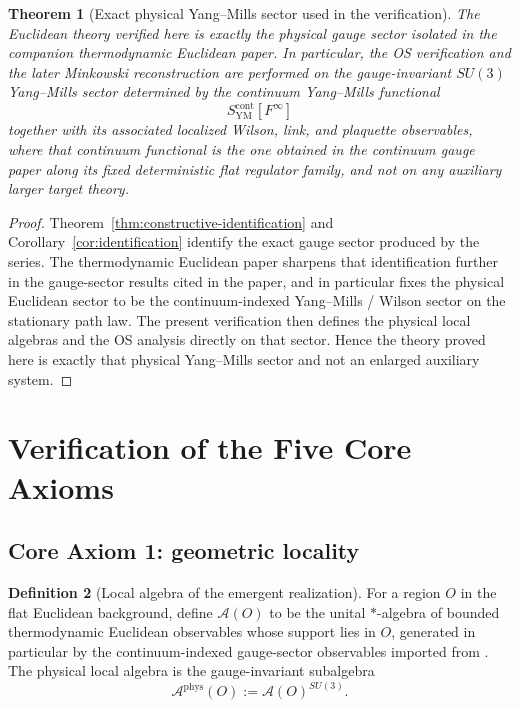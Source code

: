 \documentclass[11pt]{article}
\newtheorem{theorem}{Theorem}[section]
\theoremstyle{definition}
\newtheorem{definition}[theorem]{Definition}
\theoremstyle{remark}
\newcommand{\mcA}{\mathcal A}
\begin{document}
\begin{theorem}[Exact physical Yang--Mills sector used in the verification]
\label{thm:physical-ym-sector}
The Euclidean theory verified here is exactly the physical
gauge sector isolated in the companion thermodynamic Euclidean paper.  In
particular, the OS verification and the later Minkowski reconstruction are
performed on the gauge-invariant \(SU(3)\) Yang--Mills sector determined by the
continuum Yang--Mills functional
\[
S_{\mathrm{YM}}^{\mathrm{cont}}[F^\infty]
\]
together with its associated localized Wilson, link, and plaquette
observables, where that continuum functional is the one obtained in the
continuum gauge paper along its fixed deterministic flat regulator family, and
not on any auxiliary larger target theory.
\end{theorem}

\begin{proof}
Theorem~\ref{thm:constructive-identification} and Corollary~\ref{cor:identification}
identify the exact gauge sector produced by the series.  The thermodynamic
Euclidean paper sharpens that identification further in the gauge-sector
results cited in the paper, and in particular fixes the physical
Euclidean sector to be the continuum-indexed Yang--Mills / Wilson sector on the
stationary path law.  The present verification then defines the physical local
algebras and the OS analysis directly on that sector.  Hence the theory proved
here is exactly that physical Yang--Mills sector and not an enlarged auxiliary
system.
\end{proof}

\section{Verification of the Five Core Axioms}
\label{sec:core}

\subsection{Core Axiom 1: geometric locality}

\begin{definition}[Local algebra of the emergent realization]
\label{def:local-algebra}
For a region $O$ in the flat Euclidean background, define $\mcA(O)$ to be the
unital $*$-algebra of bounded thermodynamic Euclidean observables whose support
lies in $O$, generated in particular by the continuum-indexed gauge-sector
observables imported from \cite{lattice,quantization}.
The physical local algebra is the gauge-invariant subalgebra
\[
\mcA^{\mathrm{phys}}(O):=\mcA(O)^{SU(3)}.
\]
\end{definition}
\end{document}
